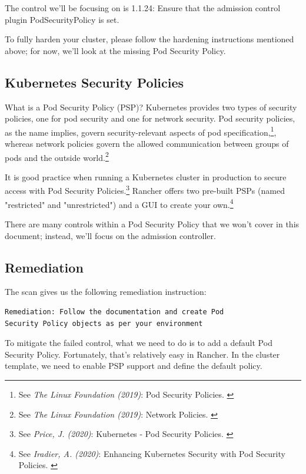 The control we'll be focusing on is 1.1.24: Ensure that the admission control plugin PodSecurityPolicy is set.

To fully harden your cluster, please follow the hardening instructions mentioned above; for now, we'll look at the missing Pod Security Policy.

\subsection{Kubernetes Security Policies}

What is a Pod Security Policy (PSP)? Kubernetes provides two types of security policies, one for pod security and one for network security. Pod security policies, as the name implies, govern security-relevant aspects of pod specification,\footnote{See \textit{The Linux Foundation (2019)}: Pod Security Policies. \cite{podSecurity}}, whereas network policies govern the allowed communication between groups of pods and the outside world.\footnote{See \textit{The Linux Foundation (2019)}: Network Policies. \cite{netSecurity}}

It is good practice when running a Kubernetes cluster in production to secure access with Pod Security Policies.\footnote{See \textit{Price, J. (2020)}: Kubernetes - Pod Security Policies. \cite{examplePsp}} Rancher offers two pre-built PSPs (named "restricted" and "unrestricted") and a GUI to create your own.\footnote{See \textit{Iradier, A. (2020)}: Enhancing Kubernetes Security with Pod Security Policies. \cite{detailPsp}}

There are many controls within a Pod Security Policy that we won't cover in this document; instead, we'll focus on the admission controller.

\subsection{Remediation}

The scan gives us the following remediation instruction:

\begin{verbatim}
Remediation: Follow the documentation and create Pod 
Security Policy objects as per your environment   
\end{verbatim}

To mitigate the failed control, what we need to do is to add a default Pod Security Policy. Fortunately, that's relatively easy in Rancher. In the cluster template, we need to enable PSP support and define the default policy.

